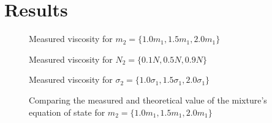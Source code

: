 \chapter{Results}

\begin{figure}[htbp]
    \begin{center}
        
        \caption{
            Measured viscosity for $m_2 = 
            \{1.0m_1, 1.5m_1, 2.0m_1\}$
        }
    \end{center}
\end{figure}

\begin{figure}[htbp]
    \begin{center}
        
        \caption{
            Measured viscosity for $N_2 = 
            \{0.1N, 0.5N, 0.9N\}$
        }
    \end{center}
\end{figure}

\begin{figure}[htbp]
    \begin{center}
        
        \caption{
            Measured viscosity for $\sigma_2 = 
            \{1.0\sigma_1, 1.5\sigma_1, 2.0\sigma_1\}$
        }
    \end{center}

\end{figure}
\begin{figure}[htbp]
    \begin{center}
        
    \end{center}
        \caption{
            Comparing the measured and theoretical value of the mixture's
            equation of state for $m_2 = \{1.0m_1, 1.5m_1, 2.0m_1\}$
        }
\end{figure}
